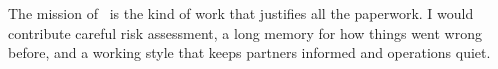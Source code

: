 
The mission of \theshortname\ is the kind of work that justifies all the paperwork. I would contribute careful risk assessment, a long memory for how things went wrong before, and a working style that keeps partners informed and operations quiet.
